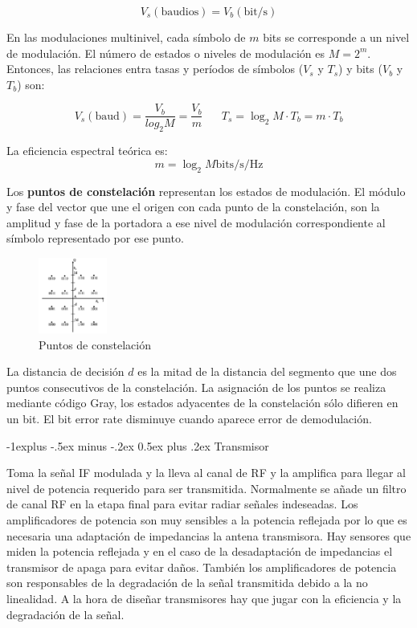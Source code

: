 \documentclass[10pt,portrait, twocolumn]{article}
\makeatletter
\renewcommand{\subsection}{\@startsection{subsection}{2}{0mm}%
                                {-1explus -.5ex minus -.2ex}%
                                {0.5ex plus .2ex}%
                                {\normalfont\normalsize\bfseries}}
\makeatother
\begin{document}
	\begin{equation*}
	V_{s} (\text{baudios}) = V_{b} (\text{bit}/\text{s})
	\end{equation*} 
	
En las modulaciones multinivel, cada símbolo de $m$ bits se corresponde a un nivel de modulación. El número de estados o niveles de modulación es $M = 2^{m}$. Entonces, las relaciones entra tasas y períodos de símbolos ($V_{s}$ y $T_{s}$) y bits ($V_{b}$ y $T_{b}$) son:

	\begin{equation*}
	V_{s} (\text{baud}) = \frac{V_{b}}{log_{2}M} = \frac{V_{b}}{m} \hspace{20pt} T_{s} = \log_{2} M \cdot T_{b} = m \cdot T_{b}
	\end{equation*}
	
La eficiencia espectral teórica es:
	\begin{equation*}
	m = \log_{2}M \text{bits}/\text{s}/\text{Hz}
	\end{equation*}
	
Los \textbf{puntos de constelación} representan los estados de modulación. El módulo y fase del vector que une el origen con cada punto de la constelación, son la amplitud y fase de la portadora a ese nivel de modulación correspondiente al símbolo representado por ese punto.

\begin{figure}[h]
	\centering
       \includegraphics[width=0.2\textwidth]{IQ}
      \caption{Puntos de constelación}
\end{figure}

La distancia de decisión $d$ es la mitad de la distancia del segmento que une dos puntos consecutivos de la constelación. La asignación de los puntos se realiza mediante código Gray, los estados adyacentes de la constelación sólo difieren en un bit. El bit error rate disminuye cuando aparece error de demodulación.

\subsection{Transmisor}

Toma la señal IF modulada y la lleva al canal de RF y la amplifica para llegar al nivel de potencia requerido para ser transmitida. Normalmente se añade un filtro de canal RF en la etapa final para evitar radiar señales indeseadas. Los amplificadores de potencia son muy sensibles a la potencia reflejada por lo que es necesaria una adaptación de impedancias la antena transmisora. Hay sensores que miden la potencia reflejada y en el caso de la desadaptación de impedancias el transmisor de apaga para evitar daños. También los amplificadores de potencia son responsables de la degradación de la señal transmitida debido a la no linealidad. A la hora de diseñar transmisores hay que jugar con la eficiencia y la degradación de la señal.
\end{document}
